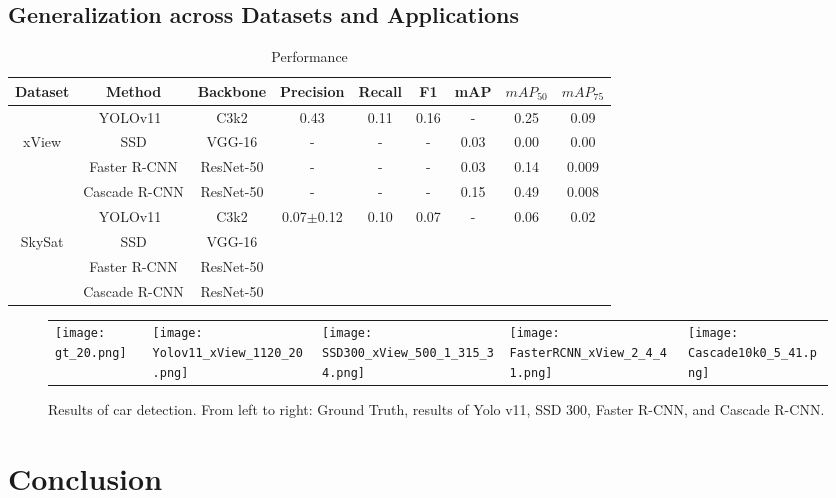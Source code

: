 \documentclass{article}
\begin{document}
\subsection{Generalization across Datasets and Applications}

\begin{table}[!htb]
\centering
\caption{Performance}
\begin{tabular}{c|c|ccccccc}
\hline
Dataset& Method&Backbone&Precision&Recall&F1&mAP&$mAP_{50}$&$mAP_{75}$  \\
\hline\hline
& YOLOv11~\cite{yolo11_ultralytics}&C3k2&0.43&0.11&0.16&-&0.25&0.09\\
xView & SSD&VGG-16&-&-&-&0.03&0.00&0.00\\
& Faster R-CNN&ResNet-50&-&-&-&0.03&0.14&0.009\\
& Cascade R-CNN&ResNet-50&-&-&-&0.15&0.49&0.008\\
\hline
& YOLOv11~\cite{yolo11_ultralytics}&C3k2&0.07$\pm$0.12&0.10&0.07&-&0.06&0.02\\
SkySat& SSD&VGG-16&&&&&\\
& Faster R-CNN&ResNet-50&&&&&&\\
& Cascade R-CNN&ResNet-50&&&&&\\
\hline
\end{tabular}\label{tb:quantitative results}
\end{table}

\begin{figure}[!htb]
\centering
\begin{tabular}{@{}p{1in}p{1in}p{1in}p{1in}p{1in}}
\texttt{[image: gt\_20.png]}&
\texttt{[image: Yolov11\_xView\_1120\_20.png]}&
\texttt{[image: SSD300\_xView\_500\_1\_315\_34.png]}&
\texttt{[image: FasterRCNN\_xView\_2\_4\_41.png]}&
\texttt{[image: Cascade10k0\_5\_41.png]}
\end{tabular}
\caption{Results of car detection. From left to right: Ground Truth, results of Yolo v11, SSD 300, Faster R-CNN, and Cascade R-CNN. 
\label{fig:qualitative results}}
\end{figure}






\section{Conclusion \label{sec:Conclusion}}
\end{document}
